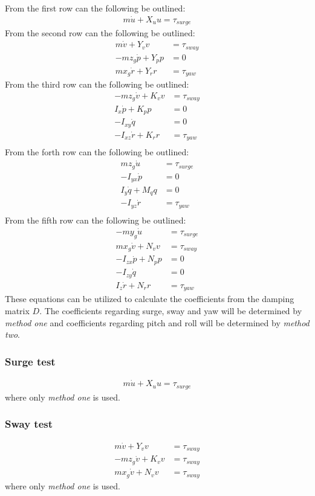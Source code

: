 From the first row can the following be outlined:
\begin{align}
m\dot u + X_uu = \tau_{surge}
\end{align}
From the second row can the following be outlined:
\begin{align}
m\dot v + Y_vv &= \tau_{sway}\\
-mz_g\dot p + Y_pp &= 0\\
mx_g\dot r + Y_rr &= \tau_{yaw}
\end{align}
From the third row can the following be outlined:
\begin{align}
-mz_g\dot v + K_vv &= \tau_{sway}\\
I_x\dot p + K_pp &= 0\\
-I_{xy}\dot q &= 0\\
-I_{xz}\dot r + K_rr &= \tau_{yaw}\\
\end{align}
From the forth row can the following be outlined:
\begin{align}
mz_g\dot u &= \tau_{surge}\\
-I_{yx}\dot p &= 0\\
I_y\dot q + M_qq &= 0\\
-I_{yz}\dot r &= \tau_{yaw}\\
\end{align}
From the fifth row can the following be outlined:
\begin{align}
-my_g\dot u &= \tau_{surge}\\
mx_g\dot v + N_vv &= \tau_{sway}\\
-I_{zx}\dot p + N_pp &= 0\\
-I_{zy}\dot q &= 0\\
I_z\dot r + N_rr &= \tau_{yaw}
\end{align}
These equations can be utilized to calculate the coefficients from the damping matrix $D$. The coefficients regarding surge, sway and yaw will be determined by \textit{method one} and coefficients regarding pitch and roll will be determined by \textit{method two}.

\subsubsection{Surge test}
\begin{align}
m\dot u + X_uu = \tau_{surge}
\end{align}
where only \textit{method one} is used.

\subsubsection{Sway test}
\begin{align}
m\dot v + Y_vv &= \tau_{sway}\\
-mz_g\dot v + K_vv &= \tau_{sway}\\
mx_g\dot v + N_vv &= \tau_{sway}
\end{align}
where only \textit{method one} is used.

